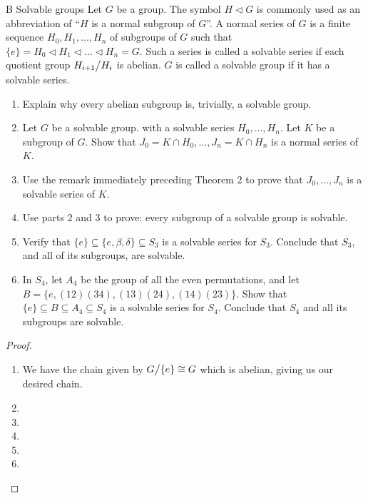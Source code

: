 \begin{exercise}{B Solvable groups}
Let $G$ be a group. The symbol $H\triangleleft G$ is commonly used as an abbreviation of ``$H$ is a normal subgroup of $G$''. A normal series of $G$ is a finite sequence $H_0,H_1,\dots,H_n$ of subgroups of $G$ such that $\{e\}=H_0\triangleleft H_1\triangleleft\dots\triangleleft H_n=G$. Such a series is called a solvable series if each quotient group ${\textstyle H_{i+1}}\big/{\textstyle H_i}$ is abelian. $G$ is called a solvable group if it has a solvable series.
\begin{enumerate}
    \item Explain why every abelian subgroup is, trivially, a solvable group.
    \item Let $G$ be a solvable group. with a solvable series $H_0,\dots,H_n$. Let $K$ be a subgroup of $G$. Show that $J_0=K\cap H_0,\dots,J_n=K\cap H_n$ is a normal series of $K$.
    \item Use the remark immediately preceding Theorem 2 to prove that $J_0,\dots,J_n$ is a solvable series of $K$.
     \item Use parts 2 and 3 to prove: every subgroup of a solvable group is solvable.
     \item Verify that $\{e\}\subseteq\{e,\beta,\delta\}\subseteq S_3$ is a solvable series for $S_3$. Conclude that $S_3$, and all of its subgroups, are solvable.
     \item In $S_4$, let $A_4$ be the group of all the even permutations, and let $B=\{e,(12)(34),(13)(24),(14)(23)\}$. Show that $\{e\}\subseteq B\subseteq A_4\subseteq S_4$ is a solvable series for $S_4$. Conclude that $S_4$ and all its subgroups are solvable.
\end{enumerate}
\end{exercise}
\begin{proof}
 \begin{enumerate}
     \item We have the chain given by ${\textstyle G}\big/{\textstyle \{e\}}\cong G$ which is abelian, giving us our desired chain.
     \item
     \item 
     \item
     \item
     \item
 \end{enumerate}
\end{proof}